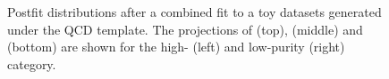 \begin{figure}[h!]
\caption{Postfit distributions after a combined fit to a toy datasets generated under the QCD \HERWIG{++} template. The projections of \MJO (top), \MJT (middle) and \MVV (bottom) are shown for the high- (left) and low-purity (right) category.}
\label{fig:postfitHerwig}
\end{figure}
